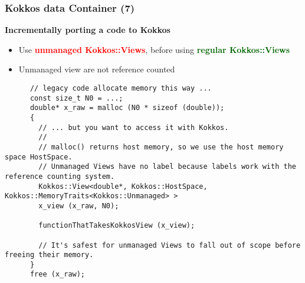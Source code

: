 \begin{frame}[fragile=singleslide]
  \frametitle{Kokkos data Container (7)}

  {\Large \bf Incrementally porting a code to Kokkos}

  \begin{itemize}
  \item Use \textcolor{red}{\bf unmanaged Kokkos::Views}, before using \textcolor{darkgreen}{\bf regular Kokkos::Views}
  \item Unmanaged view are not reference counted
  \end{itemize}

  { \scriptsize
    \begin{verbatim}
      // legacy code allocate memory this way ...
      const size_t N0 = ...;
      double* x_raw = malloc (N0 * sizeof (double));
      {
        // ... but you want to access it with Kokkos.
        //
        // malloc() returns host memory, so we use the host memory space HostSpace.  
        // Unmanaged Views have no label because labels work with the reference counting system.
        Kokkos::View<double*, Kokkos::HostSpace, Kokkos::MemoryTraits<Kokkos::Unmanaged> >
        x_view (x_raw, N0);
        
        functionThatTakesKokkosView (x_view);
        
        // It's safest for unmanaged Views to fall out of scope before freeing their memory.
      }
      free (x_raw);
    \end{verbatim}
    }
  
\end{frame}
